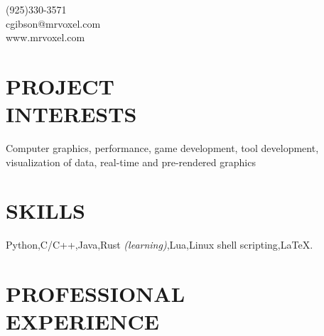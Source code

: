 \documentclass[margin,line]{resume}
\begin{document}
{
	\sc
    \hfill (925)330-3571                  \vspace{0mm}\\\vspace{0mm}%
    \hfill cgibson@mrvoxel.com            \vspace{0mm}\\\vspace{0mm}%
    \hfill www.mrvoxel.com                \vspace{0mm}\\\vspace{-10mm}%
}

\begin{resume}

\vspace{1mm}

    \section{\mysidestyle \textbf{\large{P}\small{ROJECT\\INTERESTS}}}

	Computer graphics, performance, game development, tool development, visualization of data, real-time and pre-rendered graphics

\sectionline

    \section{\mysidestyle \textbf{\large{S}\small{KILLS}}}

    Python,\hspace{2mm}C/C++,\hspace{2mm}Java,\hspace{2mm}Rust \textsl{\small(learning)},\hspace{2mm}Lua,\hspace{2mm}Linux shell scripting,\hspace{2mm}\LaTeX.


\sectionline

    \section{\mysidestyle \textbf{\large{P}\small{ROFESSIONAL\\EXPERIENCE}}}


\end{resume}
\end{document}
